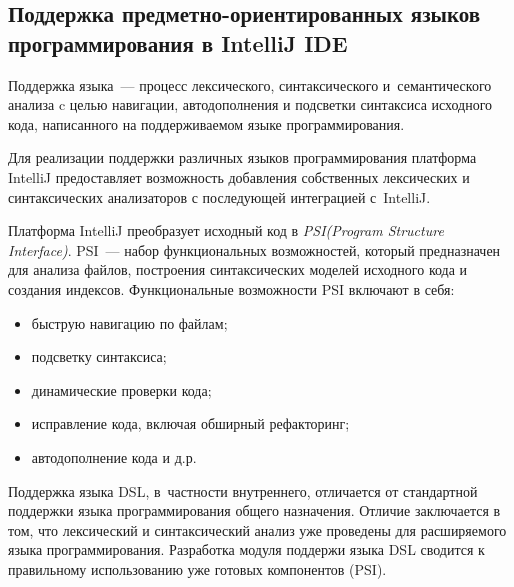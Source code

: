 \subsection{Поддержка предметно-ориентированных языков программирования в IntelliJ IDE} \label{sub132}

Поддержка языка~--- процесс лексического, синтаксического и~семантического анализа c целью навигации, автодополнения и подсветки синтаксиса исходного кода, написанного на поддерживаемом языке программирования. 

Для реализации поддержки различных языков программирования платформа IntelliJ предоставляет возможность добавления собственных лексических и синтаксических анализаторов с последующей интеграцией с~IntelliJ.

Платформа IntelliJ преобразует исходный код в \textit{PSI(Program Structure Interface)}. PSI~--- набор функциональных возможностей, который предназначен для анализа файлов, построения синтаксических моделей исходного кода и создания индексов. Функциональные возможности PSI включают в себя:

\begin{itemize}
\item{быструю навигацию по файлам;}
\item{подсветку синтаксиса;}
\item{динамические проверки кода;}
\item{исправление кода, включая обширный рефакторинг;}
\item{автодополнение кода и д.р.}
\end{itemize}

Поддержка языка DSL, в~частности внутреннего, отличается от стандартной поддержки языка программирования общего назначения. Отличие заключается в том, что лексический и синтаксический анализ уже проведены для расширяемого языка программирования. Разработка модуля поддержи языка DSL сводится к правильному использованию уже готовых компонентов (PSI).
